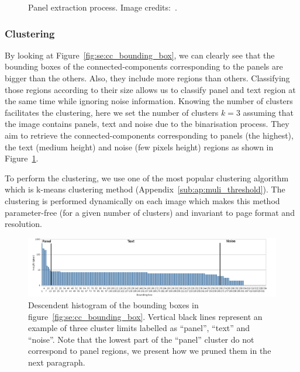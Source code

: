 \begin{figure}[!ht]
		  \caption[Panel extraction process]{Panel extraction process. Image credits:~\cite{Bubble09}.}
	\end{figure}




\subsubsection{Clustering} %
\label{par:clustering}
By looking at Figure~\ref{fig:se:cc_bounding_box}, we can clearly see that the bounding boxes of the connected-components corresponding to the panels are bigger than the others.
Also, they include more regions than others.
Classifying those regions according to their size allows us to classify panel and text region at the same time while ignoring noise information.
Knowing the number of clusters facilitates the clustering, here we set the number of clusters $k=3$ assuming that the image contains panels, text and noise due to the binarisation process.
They aim to retrieve the connected-components corresponding to panels (the highest), the text (medium height) and noise (few pixels height) regions as shown in Figure~\ref{fig:se:histo_roi}.

To perform the clustering, we use one of the most popular clustering algorithm which is k-means clustering method (Appendix~\ref{sub:ap:muli_threshold}).
The clustering is performed dynamically on each image which makes this method parameter-free (for a given number of clusters) and invariant to page format and resolution.

	\begin{figure}[!ht]	%
	  \centering
		\includegraphics[trim= 5mm 0mm 10mm 0mm, clip,width=1.0\textwidth]{Histogram_en.png}
		\caption[Descendant histogram of the connected component bounding box heights]{Descendent histogram of the bounding boxes in figure~\ref{fig:se:cc_bounding_box}. Vertical black lines represent an example of three cluster limits labelled as ``panel'', ``text'' and ``noise''. Note that the lowest part of the ``panel'' cluster do not correspond to panel regions, we present how we pruned them in the next paragraph.}
		\label{fig:se:histo_roi}
	\end{figure}


